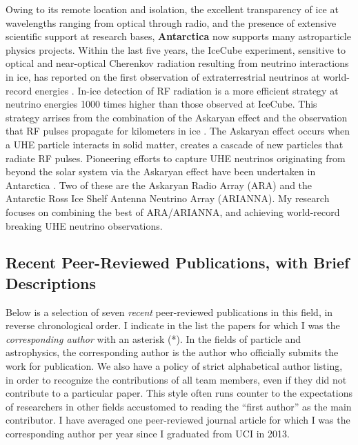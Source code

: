 \documentclass[../../main.tex]{subfiles}
\begin{document}
Owing to its remote location and isolation, the excellent transparency of ice at wavelengths ranging from optical through radio, and the presence of extensive scientific support at research bases, \textbf{Antarctica} now supports many astroparticle physics projects.  Within the last five years,  the IceCube experiment, sensitive to optical and near-optical Cherenkov radiation resulting from neutrino interactions in ice, has reported on the first observation of extraterrestrial neutrinos at world-record energies \cite{Aartsen:2016xlq}.  In-ice detection of RF radiation is a more efficient strategy at neutrino energies 1000 times higher than those observed at IceCube. This strategy arrises from the combination of the Askaryan effect \cite{Askaryan:1962hbi,1962JPSJS..17C.257A,1965JETP...21..658A} and the observation that RF pulses propagate for kilometers in ice \cite{barrella_barwick_saltzberg_2011,barwick_besson_gorham_saltzberg_2005}.  The Askaryan effect occurs when a UHE particle interacts in solid matter, creates a cascade of new particles that radiate RF pulses.  Pioneering efforts to capture UHE neutrinos originating from beyond the solar system via the Askaryan effect have been undertaken in Antarctica \cite{Allison:2015eky,Barwick:2014pca,Gorham:2008dv,Kravchenko:2001id}.  Two of these are the Askaryan Radio Array (ARA) and the Antarctic Ross Ice Shelf Antenna Neutrino Array (ARIANNA).  My research focuses on combining the best of ARA/ARIANNA, and achieving world-record breaking UHE neutrino observations.

\subsection{Recent Peer-Reviewed Publications, with Brief Descriptions}

Below is a selection of seven \textit{recent} peer-reviewed publications in this field, in reverse chronological order.  I indicate in the list the papers for which I was the  \textit{corresponding author} with an asterisk (*).  In the fields of particle and astrophysics, the corresponding author is the author who officially submits the work for publication.  We also have a policy of strict alphabetical author listing, in order to recognize the contributions of all team members, even if they did not contribute to a particular paper.  This style often runs counter to the expectations of researchers in other fields accustomed to reading the ``first author'' as the main contributor.  I have averaged one peer-reviewed journal article for which I was the corresponding author per year since I graduated from UCI in 2013. \\ \hspace{0.1cm}
\end{document}
